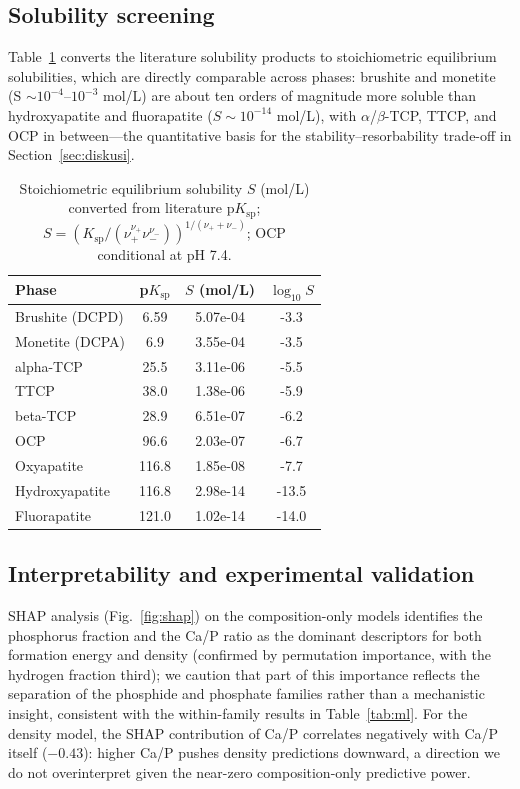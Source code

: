 \documentclass[review,11pt,a4paper]{elsarticle}
\begin{document}
\subsection{Solubility screening}\label{sec:kelarutan}
Table~\ref{tab:kelarutan} converts the literature solubility products to stoichiometric equilibrium solubilities, which are directly comparable across phases: brushite and monetite (S $\sim 10^{-4}$--$10^{-3}$ mol/L) are about ten orders of magnitude more soluble than hydroxyapatite and fluorapatite ($S \sim 10^{-14}$ mol/L), with $\alpha$/$\beta$-TCP, TTCP, and OCP in between---the quantitative basis for the stability--resorbability trade-off in Section~\ref{sec:diskusi}.

\begin{table}[ht]
\centering\small
\caption{Stoichiometric equilibrium solubility $S$ (mol/L) converted from literature p$K_\mathrm{sp}$; $S = (K_\mathrm{sp}/(\nu_+^{\nu_+}\nu_-^{\nu_-}))^{1/(\nu_++\nu_-)}$; OCP conditional at pH 7.4.}
\label{tab:kelarutan}
\begin{tabular}{lccc}
\toprule
Phase & p$K_\mathrm{sp}$ & $S$ (mol/L) & $\log_{10}S$ \\
\midrule
Brushite (DCPD) & 6.59 & 5.07e-04 & -3.3 \\
Monetite (DCPA) & 6.9 & 3.55e-04 & -3.5 \\
alpha-TCP & 25.5 & 3.11e-06 & -5.5 \\
TTCP & 38.0 & 1.38e-06 & -5.9 \\
beta-TCP & 28.9 & 6.51e-07 & -6.2 \\
OCP & 96.6 & 2.03e-07 & -6.7 \\
Oxyapatite & 116.8 & 1.85e-08 & -7.7 \\
Hydroxyapatite & 116.8 & 2.98e-14 & -13.5 \\
Fluorapatite & 121.0 & 1.02e-14 & -14.0 \\
\bottomrule
\end{tabular}
\end{table}


\subsection{Interpretability and experimental validation}\label{sec:validasi}
SHAP analysis (Fig.~\ref{fig:shap}) on the composition-only models identifies the phosphorus fraction and the Ca/P ratio as the dominant descriptors for both formation energy and density (confirmed by permutation importance, with the hydrogen fraction third); we caution that part of this importance reflects the separation of the phosphide and phosphate families rather than a mechanistic insight, consistent with the within-family results in Table~\ref{tab:ml}. For the density model, the SHAP contribution of Ca/P correlates negatively with Ca/P itself ($-0.43$): higher Ca/P pushes density predictions downward, a direction we do not overinterpret given the near-zero composition-only predictive power.
\end{document}
